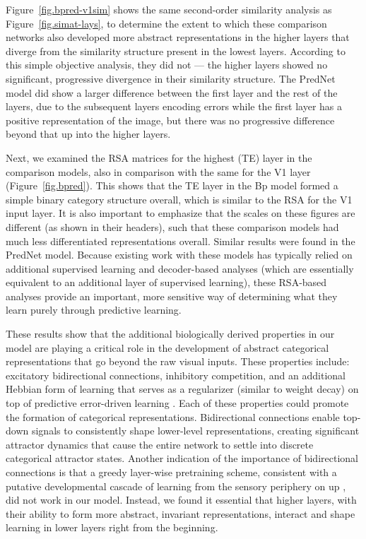 \documentclass[11pt,twoside]{article}
\newif\myifpdf
\begin{document}
Figure~\ref{fig.bpred-v1sim} shows the same second-order similarity analysis as Figure~\ref{fig.simat-lays}, to determine the extent to which these comparison networks also developed more abstract representations in the higher layers that diverge from the similarity structure present in the lowest layers.  According to this simple objective analysis, they did not --- the higher layers showed no significant, progressive divergence in their similarity structure.  The PredNet model did show a larger difference between the first layer and the rest of the layers, due to the subsequent layers encoding errors while the first layer has a positive representation of the image, but there was no progressive difference beyond that up into the higher layers.

Next, we examined the RSA matrices for the highest (TE) layer in the comparison models, also in comparison with the same for the V1 layer (Figure~\ref{fig.bpred}).  This shows that the TE layer in the Bp model formed a simple binary category structure overall, which is similar to the RSA for the V1 input layer.  It is also important to emphasize that the scales on these figures are different (as shown in their headers), such that these comparison models had much less differentiated representations overall.  Similar results were found in the PredNet model.  Because existing work with these models has typically relied on additional supervised learning and decoder-based analyses (which are essentially equivalent to an additional layer of supervised learning), these RSA-based analyses provide an important, more sensitive way of determining what they learn purely through predictive learning.

These results show that the additional biologically derived properties in our model are playing a critical role in the development of abstract categorical representations that go beyond the raw visual inputs. These properties include: excitatory bidirectional connections, inhibitory competition, and an additional Hebbian form of learning that serves as a regularizer (similar to weight decay) on top of predictive error-driven learning \citep{OReilly98,OReillyMunakata00}.  Each of these properties could promote the formation of categorical representations. Bidirectional connections enable top-down signals to consistently shape lower-level representations, creating significant attractor dynamics that cause the entire network to settle into discrete categorical attractor states.  Another indication of the importance of bidirectional connections is that a greedy layer-wise pretraining scheme, consistent with a putative developmental cascade of learning from the sensory periphery on up \citep{ShragerJohnson96,BengioYaoAlainEtAl13,Valpola14,HintonSalakhutdinov06}, did not work in our model. Instead, we found it essential that higher layers, with their ability to form more abstract, invariant representations, interact and shape learning in lower layers right from the beginning.
\end{document}

